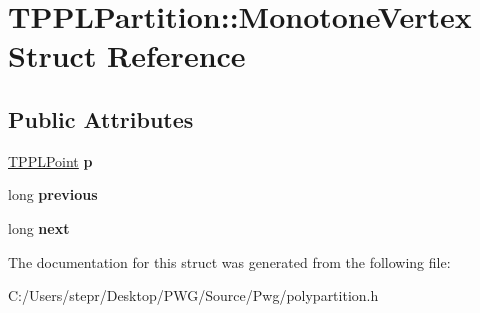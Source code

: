 \hypertarget{struct_t_p_p_l_partition_1_1_monotone_vertex}{}\section{T\+P\+P\+L\+Partition\+:\+:Monotone\+Vertex Struct Reference}
\label{struct_t_p_p_l_partition_1_1_monotone_vertex}
\subsection*{Public Attributes}
\begin{DoxyCompactItemize}
\item 
\mbox{\label{struct_t_p_p_l_partition_1_1_monotone_vertex_a63b3f8b264269d279caef2ab4619608c}} 
\mbox{\hyperlink{struct_t_p_p_l_point}{T\+P\+P\+L\+Point}} {\bfseries p}
\item 
\mbox{\label{struct_t_p_p_l_partition_1_1_monotone_vertex_a5c4fdb47a68a585053bfc1cbbfa3f3aa}} 
long {\bfseries previous}
\item 
\mbox{\label{struct_t_p_p_l_partition_1_1_monotone_vertex_aaf6908c7b127b8806897eb463f237fb1}} 
long {\bfseries next}
\end{DoxyCompactItemize}


The documentation for this struct was generated from the following file\+:\begin{DoxyCompactItemize}
\item 
C\+:/\+Users/stepr/\+Desktop/\+P\+W\+G/\+Source/\+Pwg/polypartition.\+h\end{DoxyCompactItemize}
